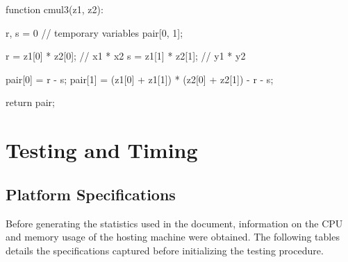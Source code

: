 \documentclass[usletter, 12pt]{article}
\begin{document}
\begin{pseudocode}[caption={Three Multiplication}, label={alg3}]
function cmul3(z1, z2):

    r, s = 0  // temporary variables
    pair[0, 1];

    r = z1[0] * z2[0];  // x1 * x2
    s = z1[1] * z2[1];  // y1 * y2

    pair[0] = r - s;
    pair[1] = (z1[0] + z1[1]) * (z2[0] + z2[1]) - r - s;

    return pair;

\end{pseudocode}

    \clearpage
    \newpage
    \section{Testing and Timing}

        \subsection{Platform Specifications}
        Before generating the statistics used in the document, information on the CPU and memory usage of the hosting machine were obtained. The following tables details the specifications captured before initializing the testing procedure.
\end{document}
